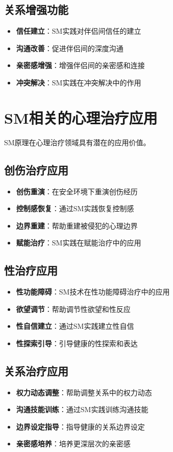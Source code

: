 \documentclass[12pt,UTF8]{ctexbook}
\begin{document}
\subsection{关系增强功能}
\begin{itemize}[leftmargin=2cm]
	\item \textbf{信任建立}：SM实践对伴侣间信任的建立
	\item \textbf{沟通改善}：促进伴侣间的深度沟通
	\item \textbf{亲密感增强}：增强伴侣间的亲密感和连接
	\item \textbf{冲突解决}：SM实践在冲突解决中的作用
\end{itemize}

\section{SM相关的心理治疗应用}
SM原理在心理治疗领域具有潜在的应用价值。

\subsection{创伤治疗应用}
\begin{itemize}[leftmargin=2cm]
	\item \textbf{创伤重演}：在安全环境下重演创伤经历
	\item \textbf{控制感恢复}：通过SM实践恢复控制感
	\item \textbf{边界重建}：帮助重建被侵犯的心理边界
	\item \textbf{赋能治疗}：SM实践在赋能治疗中的应用
\end{itemize}

\subsection{性治疗应用}
\begin{itemize}[leftmargin=2cm]
	\item \textbf{性功能障碍}：SM技术在性功能障碍治疗中的应用
	\item \textbf{欲望调节}：帮助调节性欲望和性反应
	\item \textbf{性自信建立}：通过SM实践建立性自信
	\item \textbf{性探索引导}：引导健康的性探索和表达
\end{itemize}

\subsection{关系治疗应用}
\begin{itemize}[leftmargin=2cm]
	\item \textbf{权力动态调整}：帮助调整关系中的权力动态
	\item \textbf{沟通技能训练}：通过SM实践训练沟通技能
	\item \textbf{边界设定指导}：指导健康的关系边界设定
	\item \textbf{亲密感培养}：培养更深层次的亲密感
\end{itemize}
\end{document}
